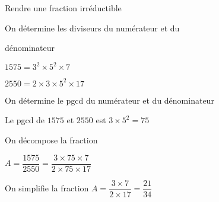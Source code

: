 \begin{pageCours}
\begin{MtT}{Rendre une fraction irréductible}
\begin{enumerate}[leftmargin=*]
\begin{minipage}{0.6\linewidth}
\item On détermine les diviseurs du numérateur et du 

dénominateur
 
$1575 = 3^2 \times 5^2 \times 7$

$2550 = 2 \times 3 \times 5^2 \times 17$

\item On détermine le pgcd du numérateur et du dénominateur

Le pgcd de $1575$ et $2550$ est $3 \times 5^2=75$

\end{minipage}
\begin{minipage}{0.4\linewidth}


\item On décompose la fraction

$A=\dfrac{1575}{2550}=\dfrac{3 \times 75 \times 7}{2 \times 75 \times 17}$

\item On simplifie la fraction $A=\dfrac{3 \times 7}{2\times 17}=\dfrac{21}{34}$
\end{minipage}
\end{enumerate}
\end{MtT}
 



\end{pageCours} 
